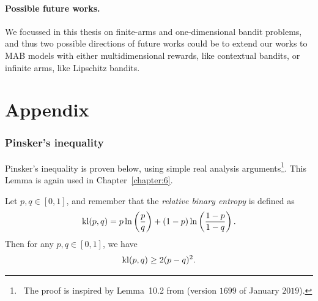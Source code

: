 \paragraph{Possible future works.}
%
We focussed in this thesis on finite-arms and one-dimensional bandit problems,
and thus two possible directions of future works could be to extend our works
to MAB models with either multidimensional rewards, like contextual bandits, or infinite arms, like Lipschitz bandits.


\section{Appendix}
\label{sec:2:appendix}


\subsubsection{Pinsker's inequality}\label{proof:2:Pinsker}

Pinsker's inequality is proven below, using simple real analysis arguments\footnote{~The proof is inspired by Lemma~10.2 from \cite{LattimoreBanditAlgorithmsBook} (version $1699$ of January $2019$).}.
%
This Lemma is again used in Chapter~\ref{chapter:6}.


\begin{lemma}\label{lem:2:Pinsker}
    Let $p,q\in[0,1]$, and remember that the \emph{relative binary entropy} is defined as
    \begin{equation}\label{eq:2:Pinsker1}
        \mathrm{kl}(p,q) = p \ln\left(\frac{p}{q}\right) + (1-p)\ln\left(\frac{1-p}{1-q}\right).
    \end{equation}
    Then for any $p,q\in[0,1]$, we have
    \begin{equation}\label{eq:2:Pinsker2}
        \mathrm{kl}(p,q) \geq 2 (p-q)^2.
    \end{equation}
\end{lemma}

